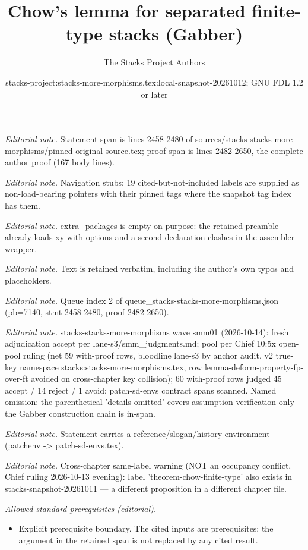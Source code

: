 \documentclass[10pt,a4paper]{amsart}
\title{Chow's lemma for separated finite-type stacks (Gabber)}
\author{The Stacks Project Authors}
\date{stacks-project:stacks-more-morphisms.tex:local-snapshot-20261012; GNU FDL 1.2 or later}
\theoremstyle{plain}
\theoremstyle{definition}
\theoremstyle{remark}
\numberwithin{equation}{subsection}
\begin{document}
\maketitle
\noindent\textit{Editorial note.} Statement span is lines 2458-2480 of sources/stacks-stacks-more-morphisms/pinned-original-source.tex; proof span is lines 2482-2650, the complete author proof (167 body lines).\par\medskip
\noindent\textit{Editorial note.} Navigation stubs: 19 cited-but-not-included labels are supplied as non-load-bearing pointers with their pinned tags where the snapshot tag index has them.\par\medskip
\noindent\textit{Editorial note.} extra\_packages is empty on purpose: the retained preamble already loads xy with options and a second declaration clashes in the assembler wrapper.\par\medskip
\noindent\textit{Editorial note.} Text is retained verbatim, including the author's own typos and placeholders.\par\medskip
\noindent\textit{Editorial note.} Queue index 2 of queue\_stacks-stacks-more-morphisms.json (pb=7140, stmt 2458-2480, proof 2482-2650).\par\medskip
\noindent\textit{Editorial note.} stacks-stacks-more-morphisms wave smm01 (2026-10-14): fresh adjudication accept per lane-s3/smm\_judgments.md; pool per Chief 10:5x open-pool ruling (net 59 with-proof rows, bloodline lane-s3 by anchor audit, v2 true-key namespace stacks:stacks-more-morphisms.tex, row lemma-deform-property-fp-over-ft avoided on cross-chapter key collision); 60 with-proof rows judged 45 accept / 14 reject / 1 avoid; patch-sd-envs contract spans scanned. Named omission: the parenthetical 'details omitted' covers assumption verification only - the Gabber construction chain is in-span.\par\medskip
\noindent\textit{Editorial note.} Statement carries a reference/slogan/history environment (patchenv -> patch-sd-envs.tex).\par\medskip
\noindent\textit{Editorial note.} Cross-chapter same-label warning (NOT an occupancy conflict, Chief ruling 2026-10-13 evening): label 'theorem-chow-finite-type' also exists in stacks-snapshot-20261011 — a different proposition in a different chapter file.\par\medskip
\noindent\textit{Allowed standard prerequisites (editorial).}\begin{itemize}
\item Explicit prerequisite boundary. The cited inputs are prerequisites; the argument in the retained span is not replaced by any cited result.
\end{itemize}\medskip
\end{document}
